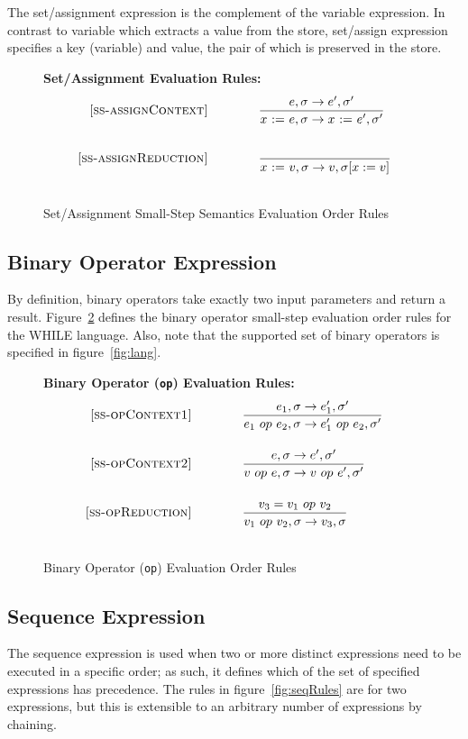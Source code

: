 \documentclass{article}
\newcommand{\assign}[2]{#1~{:=}~#2}
\begin{document}
The set/assignment expression is the complement of the variable expression.  In contrast to variable which extracts a value from the store, set/assign expression specifies a key (variable) and value, the pair of which is preserved in the store.

\begin{figure}[H]
\caption{Set/Assignment Small-Step Semantics Evaluation Order Rules}
\label{fig:assignRules}
{\bf Set/Assignment Evaluation Rules:} 
\[
\\
\begin{array}{r@{\qquad\qquad}l}
\ssrule{ss-assignContext}{
  \sstep{e}{\sigma}{e'}{\sigma'}
}{
  \sstep{\assign{x}{e}}{\sigma}{\assign{x}{e'}}{\sigma'}
}
\ssrule{ss-assignReduction}{
}{
  \sstep{\assign{x}{v}}{\sigma}{v}{\sigma[x:=v]}
}
\end{array}
\]
\end{figure}

\subsection{Binary Operator Expression}

By definition, binary operators take exactly two input parameters and return a result.  Figure~\ref{fig:opRules} defines the binary operator small-step evaluation order rules for the WHILE language.  Also, note that the supported set of binary operators is specified in figure~\ref{fig:lang}.

\begin{figure}[H]
\caption{Binary Operator ({\tt op}) Evaluation Order Rules}
\label{fig:opRules}
{\bf Binary Operator ({\tt op}) Evaluation Rules:}
\[
\\
\begin{array}{r@{\qquad\qquad}l}
\ssrule{ss-opContext1}{
  \sstep{e_1}{\sigma}{e_1'}{\sigma'}
}{
  \sstep{e_1~op~e_2}{\sigma}{e_1'~op~e_2}{\sigma'}
}
\ssrule{ss-opContext2}{
  \sstep{e}{\sigma}{e'}{\sigma'}
}{
  \sstep{v~op~e}{\sigma}{v~op~e'}{\sigma'}
}
\ssrule{ss-opReduction}{
  v_3 = v_1 ~op~ v_2
}{
  \sstep{v_1~op~v_2}{\sigma}{v_3}{\sigma}
}
\end{array}
\]
\end{figure}

\subsection{Sequence Expression}

The sequence expression is used when two or more distinct expressions need to be executed in a specific order; as such, it defines which of the set of specified expressions has precedence.  The rules in figure~\ref{fig:seqRules} are for two expressions, but this is extensible to an arbitrary number of expressions by chaining.
\end{document}
